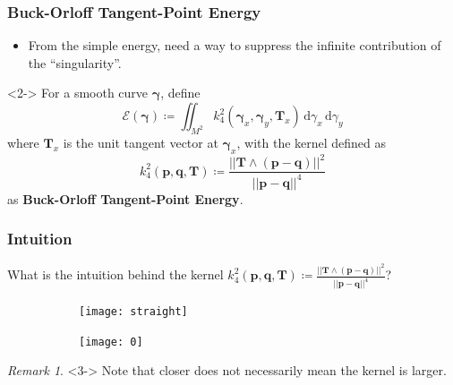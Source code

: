 \documentclass{beamer}
\theoremstyle{remark}
\newtheorem{remark}{Remark}
\newcommand{\gammabf}{\boldsymbol{\gamma}}
\newcommand{\intd}{\, \text{d}}
\newcommand{\norm}[1]{\lvert \lvert #1 \rvert \rvert}
\begin{document}
\begin{frame}
    \frametitle{Buck-Orloff Tangent-Point Energy}
    \begin{itemize}
        \item From the simple energy, need a way to suppress the infinite contribution of the ``singularity''.
    \end{itemize}
    \begin{definition}<2->
        For a smooth curve $\gammabf$, define
        \begin{equation*}
            \mathcal{E} \left( \gammabf \right) \coloneqq \iint_{M^2} k_{4}^2 \left( \gammabf_x, \gammabf_y, \mathbf{T}_x \right) \intd \gamma_x \intd \gamma_y
        \end{equation*}
        where $\mathbf{T}_x$ is the unit tangent vector at $\gammabf_x$,
        with the kernel defined as
        \begin{equation*}
            k_4^2 \left( \mathbf{p}, \mathbf{q}, \mathbf{T} \right) \coloneqq \frac{\norm{\mathbf{T} \wedge \left( \mathbf{p} - \mathbf{q} \right)}^{2}}{\norm{\mathbf{p} - \mathbf{q}}^{4}}
        \end{equation*}
        as \textbf{Buck-Orloff Tangent-Point Energy}.\cite{BO1995}
    \end{definition}
\end{frame}

\begin{frame}
    \frametitle{Intuition}
    What is the intuition behind the kernel $k_4^2 \left( \mathbf{p}, \mathbf{q}, \mathbf{T} \right) \coloneqq \frac{\norm{\mathbf{T} \wedge \left( \mathbf{p} - \mathbf{q} \right)}^{2}}{\norm{\mathbf{p} - \mathbf{q}}^{4}}$?

    {
        \begin{figure}[h]
            \centering
            \begin{subfigure}[b]{0.48\textwidth}
                \centering
                \texttt{[image: straight]}
            \end{subfigure}
            \begin{subfigure}[b]{0.48\textwidth}
                \centering
                \texttt{[image: 0]}
            \end{subfigure}
        \end{figure}
    }

    \begin{remark}<3->
        Note that closer does not necessarily mean the kernel is larger.
    \end{remark}
\end{frame}
\end{document}
